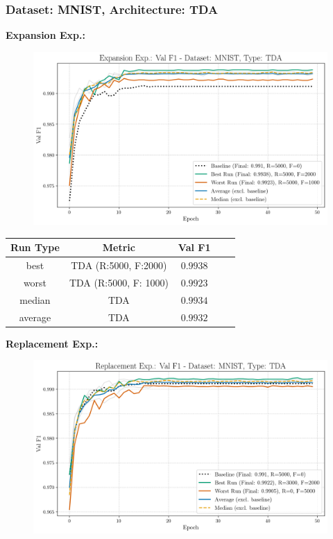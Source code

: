 \subsubsection{Dataset: MNIST, Architecture: TDA}
\noindent\textbf{Expansion Exp.:}
\begin{figure}[htbp]
	\centering
	\includegraphics[width=.85\textwidth]{abb/strat_classifier_performance/tda_mnist/expansion_experiments/val_f1_score_tda_mnist_mnist_all.png}
	\label{fig:app_strat_class_performance_expansion_exp._val_f1_score_}
\end{figure}
\begin{table}[H]
	\centering
	\vspace{-1em}
	\begin{tabular}{|c|c|c|c|c|}
		\hline
		Run Type & Metric & Val F1 \\ \hline
		best & TDA (R:5000, F:2000) & $0.9938$\\ \hline
		worst & TDA (R:5000, F: 1000) & $0.9923$\\ \hline
		median & TDA & $0.9934$\\ \hline
		average & TDA & $0.9932$
		\\ \hline
	\end{tabular}
\end{table}
\noindent\textbf{Replacement Exp.:}
\begin{figure}[htbp]
	\centering
	\includegraphics[width=.85\textwidth]{abb/strat_classifier_performance/tda_mnist/replacement_experiments/val_f1_score_tda_mnist_mnist_all.png}
	\label{fig:app_strat_class_performance_replacement_exp._val_f1_score_}
\end{figure}
